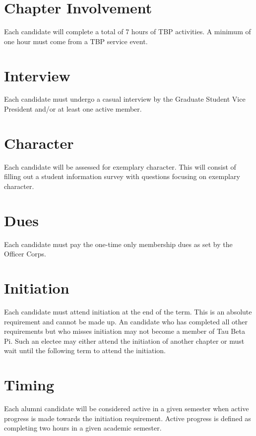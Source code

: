 \section{Chapter Involvement}
Each candidate will complete a total of 7 hours of TBP activities.
A minimum of one hour must come from a TBP service event.
\section{Interview}
Each candidate must undergo a casual interview by the Graduate Student Vice President and/or at least one active member.

\section{Character}
Each candidate will be assessed for exemplary character.
This will consist of filling out a student information survey with questions focusing on exemplary character.
\section{Dues}
Each candidate must pay the one-time only membership dues as set by the Officer Corps.
\section{Initiation}
Each candidate must attend initiation at the end of the term.
This is an absolute requirement and cannot be made up.
An candidate who has completed all other requirements but who misses initiation may not become a member of Tau Beta Pi.
Such an electee may either attend the initiation of another chapter or must wait until the following term to attend the initiation.
\section{Timing}
Each alumni candidate will be considered active in a given semester when active progress is made towards the initiation requirement.
Active progress is defined as completing two hours in a given academic semester.

